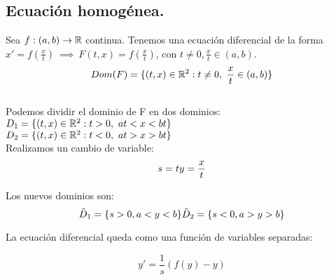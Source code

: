 \subsection{Ecuación homogénea.}

Sea $f:(a,b) \to \mathbb{R}$ continua. Tenemos una ecuación diferencial de la forma $x' = f(\frac{x}{t}) \ \implies \ F(t,x) = f(\frac{x}{t})$, con $t \neq 0, \frac{x}{t} \in (a,b)$.\\
$$Dom(F) = \{(t,x)\in \R ^2 : t \neq 0, \ \frac{x}{t} \in (a,b)\}$$\\
Podemos dividir el dominio de F en dos dominios:\\
$D_1 = \{(t,x) \in \mathbb{R} ^2 : t > 0, \ at < x < bt\}$\\
$D_2 = \{(t,x) \in \mathbb{R} ^2 : t < 0, \ at > x > bt\}$\\

Realizamos un cambio de variable:
\[
s = t\\
y = \frac{x}{t}
\]

Los nuevos dominios son:
\[
\tilde{D}_1 = \{s > 0, a < y < b\}\\
\tilde{D}_2 = \{s < 0, a > y > b\}
\]

La ecuación diferencial queda como una función de variables separadas:

$$y' = \frac{1}{s}(f(y) - y)$$


